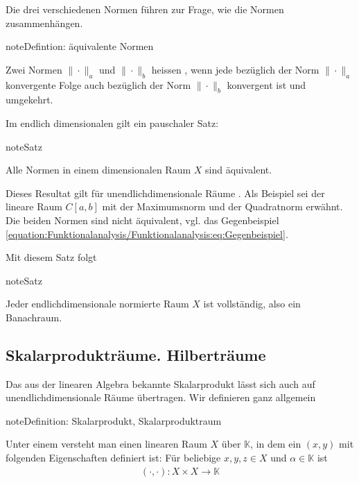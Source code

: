 \documentclass[letterpaper,10pt,english]{jupyterBook}
\begin{document}
Die drei verschiedenen Normen führen zur Frage, wie die Normen zusammenhängen.

\begin{sphinxadmonition}{note}{Defintion: äquivalente Normen}

Zwei Normen \(\|\cdot\|_a\) und \(\|\cdot\|_b\) heissen , wenn jede bezüglich der Norm \(\|\cdot\|_a\) konvergente Folge auch bezüglich der Norm \(\|\cdot\|_b\) konvergent ist und umgekehrt.
\end{sphinxadmonition}

Im endlich dimensionalen gilt ein pauschaler Satz:

\begin{sphinxadmonition}{note}{Satz}

Alle Normen in einem \sphinxhyphen{}dimensionalen Raum \(X\) sind äquivalent.
\end{sphinxadmonition}

Dieses Resultat gilt für unendlich\sphinxhyphen{}dimensionale Räume . Als Beispiel sei der lineare Raum \(C[a,b]\) mit der Maximumsnorm und der Quadratnorm erwähnt. Die beiden Normen sind nicht äquivalent, vgl. das Gegenbeispiel \eqref{equation:Funktionalanalysis/Funktionalanalysis:eq:Gegenbeispiel}.

Mit diesem Satz folgt

\begin{sphinxadmonition}{note}{Satz}

Jeder endlich\sphinxhyphen{}dimensionale normierte Raum \(X\) ist vollständig, also ein Banachraum.
\end{sphinxadmonition}


\subsection{Skalarprodukträume. Hilberträume}
\label{\detokenize{Funktionalanalysis/Funktionalanalysis:skalarproduktraume-hilbertraume}}
Das aus der linearen Algebra bekannte Skalarprodukt lässt sich auch auf unendlich\sphinxhyphen{}dimensionale Räume übertragen. Wir definieren ganz allgemein

\begin{sphinxadmonition}{note}{Definition: Skalarprodukt, Skalarproduktraum}

Unter einem  versteht man einen linearen Raum \(X\) über \(\mathbb{K}\), in dem ein  \((x,y)\) mit folgenden Eigenschaften definiert ist: Für beliebige \(x,y,z \in X\) und \(\alpha\in\mathbb{K}\) ist
\begin{equation*}
\begin{split}(\cdot, \cdot) : X \times X \to \mathbb{K}\end{split}
\end{equation*}\end{sphinxadmonition}
\end{document}
